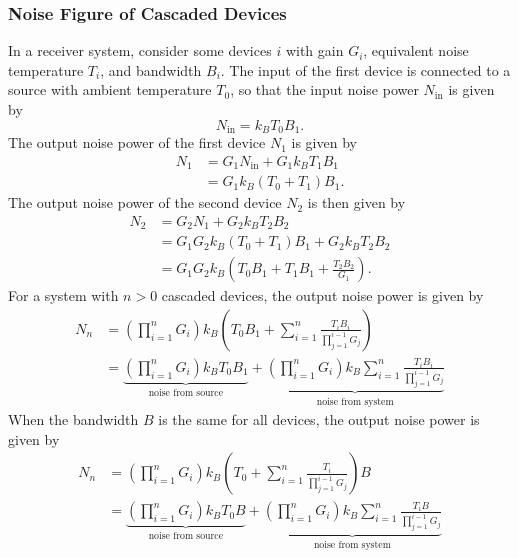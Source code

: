 \documentclass{article}
\begin{document}
\subsubsection{Noise Figure of Cascaded Devices}
In a receiver system, consider some devices \(i\) with gain \(G_i\),
equivalent noise temperature \(T_i\), and bandwidth \(B_i\). The input
of the first device is connected to a source with ambient temperature
\(T_0\), so that the input noise power \(N_\mathrm{in}\) is given by
\begin{equation*}
    N_\mathrm{in} = k_B T_0 B_1.
\end{equation*}
The output noise power of the first device \(N_1\) is given by
\begin{align*}
    N_1 & = G_1 N_\mathrm{in} + G_1 k_B T_1 B_1   \\
        & = G_1 k_B \left( T_0 + T_1 \right) B_1.
\end{align*}
The output noise power of the second device \(N_2\) is then given by
\begin{align*}
    N_2 & = G_2 N_1 + G_2 k_B T_2 B_2                                           \\
        & = G_1 G_2 k_B \left( T_0 + T_1 \right) B_1 + G_2 k_B T_2 B_2          \\
        & = G_1 G_2 k_B \left( T_0 B_1 + T_1 B_1 + \frac{T_2 B_2}{G_1} \right).
\end{align*}
For a system with \(n>0\) cascaded devices, the output noise power is given by
\begin{align*}
    N_n & = \left( \prod_{i=1}^n G_i \right) k_B \left( T_0 B_1 + \sum_{i=1}^n \frac{T_i B_i}{\prod_{j=1}^{i-1} G_j} \right)                                                                                                       \\
        & = \underbrace{\left( \prod_{i=1}^n G_i \right) k_B T_0 B_1}_{\text{noise from source}} + \underbrace{\left( \prod_{i=1}^n G_i \right) k_B \sum_{i=1}^n \frac{T_i B_i}{\prod_{j=1}^{i-1} G_j}}_{\text{noise from system}}
\end{align*}
When the bandwidth \(B\) is the same for all devices, the output noise
power is given by
\begin{align*}
    N_n & = \left( \prod_{i=1}^n G_i \right) k_B \left( T_0 + \sum_{i=1}^n \frac{T_i}{\prod_{j=1}^{i-1} G_j} \right) B                                                                                                         \\
        & = \underbrace{\left( \prod_{i=1}^n G_i \right) k_B T_0 B}_{\text{noise from source}} + \underbrace{\left( \prod_{i=1}^n G_i \right) k_B \sum_{i=1}^n \frac{T_i B}{\prod_{j=1}^{i-1} G_j}}_{\text{noise from system}}
\end{align*}
\end{document}

